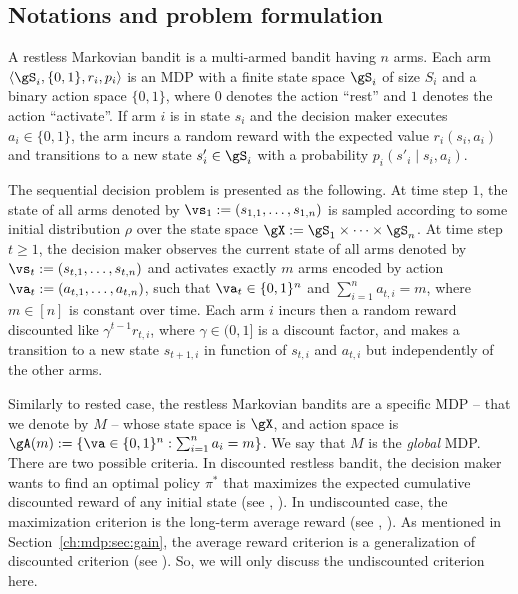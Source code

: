 \subsection{Notations and problem formulation}
\label{ssec:restless_formul}

A restless Markovian bandit is a multi-armed bandit having $n$ arms.
Each arm $\langle\gS_i, \{0,1\}, r_i, p_i\rangle$ is an MDP with a finite state space $\gS_i$ of size $S_i$ and a binary action space $\{0,1\}$, where $0$ denotes the action ``rest'' and $1$ denotes the action ``activate''.
If arm $i$ is in state $s_i$ and the decision maker executes $a_i\in\{0,1\}$, the arm incurs a random reward with the expected value $r_i(s_i,a_i)$ and transitions to a new state $s'_i\in\gS_i$ with a probability $p_i(s'_i\mid s_i,a_i)$.

The sequential decision problem is presented as the following.
At time step $1$, the state of all arms denoted by $\vs_1:=(s_{1,1},\dots,s_{1,n})$ is sampled according to some initial distribution $\rho$ over the state space $\gX:=\gS_1\times\dots\times\gS_n$.
At time step $t\ge1$, the decision maker observes the current state of all arms denoted by $\vs_t:=(s_{t,1},\dots,s_{t,n})$ and activates exactly $m$ arms encoded by action $\va_t:=(a_{t,1},\dots,a_{t,n})$, such that $\va_t\in\{0,1\}^n$ and $\sum_{i=1}^{n} a_{t,i}=m$, where $m\in[n]$ is constant over time.
Each arm $i$ incurs then a random reward discounted like $\gamma^{t-1}r_{t,i}$, where $\gamma\in(0,1]$ is a discount factor, and makes
a transition to a new state $s_{t+1,i}$ in function of $s_{t,i}$ and $a_{t,i}$ but independently of the other arms.

Similarly to rested case, the restless Markovian bandits are a specific MDP -- that we denote by $M$ -- whose state space is $\gX$, and action space is $\gA(m):=\{\va\in\{0,1\}^n : \sum_{i=1}^{n}a_i =m\}$.
We say that $M$ is the \emph{global} MDP.
There are two possible criteria.
In discounted restless bandit, the decision maker wants to find an optimal policy $\pi^*$ that maximizes the expected cumulative discounted reward of any initial state (see \eg, \cite{nino2007dynamic, fu2019towards, akbarzadeh2020conditions, nino2020fast}). 
In undiscounted case, the maximization criterion is the long-term average reward (see \eg, \cite{whittle1988restless, whittle1996optimal, papadimitriou1994complexity, gibson2021novel, avrachenkov2022whittle}).
As mentioned in Section~\ref{ch:mdp:sec:gain}, the average reward criterion is a generalization of discounted criterion (see ).
So, we will only discuss the undiscounted criterion here.

